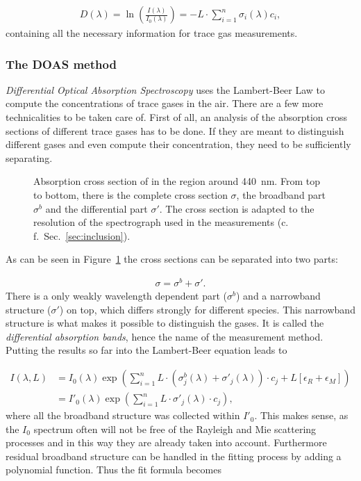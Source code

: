 \begin{align*}
  D(\lambda) = \ln \left(\frac{I(\lambda)}{I_0(\lambda)}\right) = - L
  \cdot \sum_{i=1}^n \sigma_i(\lambda) c_i,
\end{align*}
containing all the necessary information for trace gas measurements.

\subsubsection{The DOAS method}
\label{sec:doas}

\emph{Differential Optical Absorption Spectroscopy} uses the
Lambert-Beer Law to compute the concentrations of trace gases in the
air. There are a few more technicalities to be taken care of. First of
all, an analysis of the absorption cross sections of different trace
gases has to be done. If they are meant to distinguish different gases
and even compute their concentration, they need to be sufficiently
separating.

\begin{figure}[htbp]
  \centering
  
  \caption{Absorption cross section of  in the region around
    \SI{440}{\nano\meter}. From top to bottom, there is the complete
    cross section $\sigma$, the broadband part $\sigma^b$ and the
    differential part $\sigma'$. The cross section is adapted to the
    resolution of the spectrograph used in the measurements
    (c.\,f.\ Sec.~\ref{sec:inclusion}).}
  \label{fig:no2-cross}
\end{figure}

As can be seen in Figure~\ref{fig:no2-cross} the
cross sections can be separated into two parts: 

\begin{align*}
  \sigma = \sigma^b + \sigma'.
\end{align*}
There is a only weakly wavelength dependent part ($\sigma^b$) and a
narrowband structure ($\sigma'$) on top, which differs strongly for
different species. This narrowband structure is what makes it possible
to distinguish the gases. It is called the \emph{differential
  absorption bands}, hence the name of the measurement method. Putting
the results so far into the Lambert-Beer equation leads to

\begin{align*}
  I(\lambda, L) & = I_0(\lambda) \exp \left ( \sum_{i=1}^n L \cdot
                  (\sigma^b_j(\lambda) + \sigma'_j(\lambda))\cdot c_j + L[\epsilon_R +
                  \epsilon_M]\right) \\
                & = I'_0(\lambda) \exp \left( \sum_{i=1}^n L \cdot
                  \sigma'_j(\lambda) \cdot c_j \right),
\end{align*}
where all the broadband structure was collected within $I'_0$. This
makes sense, as the $I_0$ spectrum often will not be free of the Rayleigh
and Mie scattering processes and in this way they are already taken into
account. Furthermore residual broadband structure can be handled in
the fitting process by adding a polynomial function. Thus the fit
formula becomes

